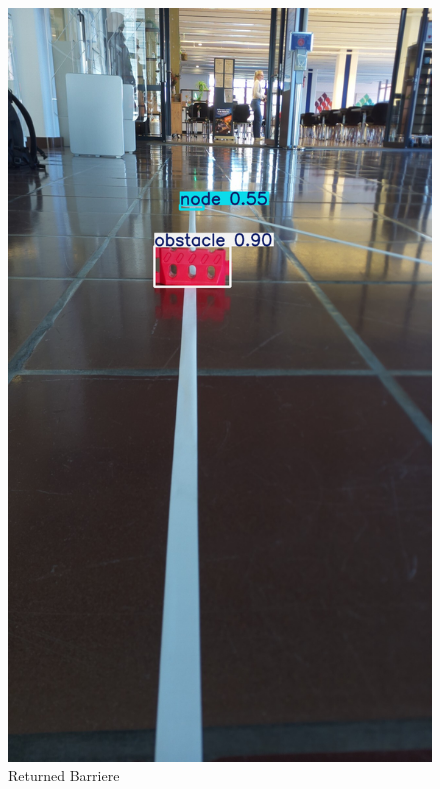 \begin{figure}[H]
\begin{minipage}[b]{0.23\textwidth}
    \includegraphics[width=\textwidth]{assets/IT/testing/yolo/barrier_annot.png}
    \caption{Returned Barriere}
    \label{fig:expl-algo-3}
  \end{minipage}
      \hfill
  \begin{minipage}[b]{0.23\textwidth}
    \centering

\end{minipage}
\end{figure}
